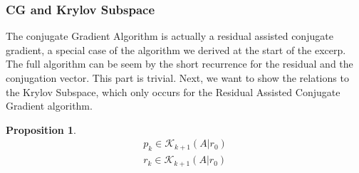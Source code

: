 \documentclass[]{article}
\theoremstyle{definition}
\newtheorem{prop}{Proposition}[section]  %
\begin{document}
        \subsubsection{CG and Krylov Subspace}\label{sec:CG_and_Krylov_Subspace}
            The conjugate Gradient Algorithm is actually a residual assisted conjugate gradient, a special case of the algorithm we derived at the start of the excerp. The full algorithm can be seem by the short recurrence for the residual and the conjugation vector. This part is trivial. Next, we want to show the relations to the Krylov Subspace, which only occurs for the Residual Assisted Conjugate Gradient algorithm. 
            \begin{prop}
                \begin{align}
                    p_k \in \mathcal K_{k + 1}(A|r_0)
                    \\
                    r_k \in \mathcal K_{k + 1}(A|r_0)
                \end{align}    
            \end{prop}
\end{document}

